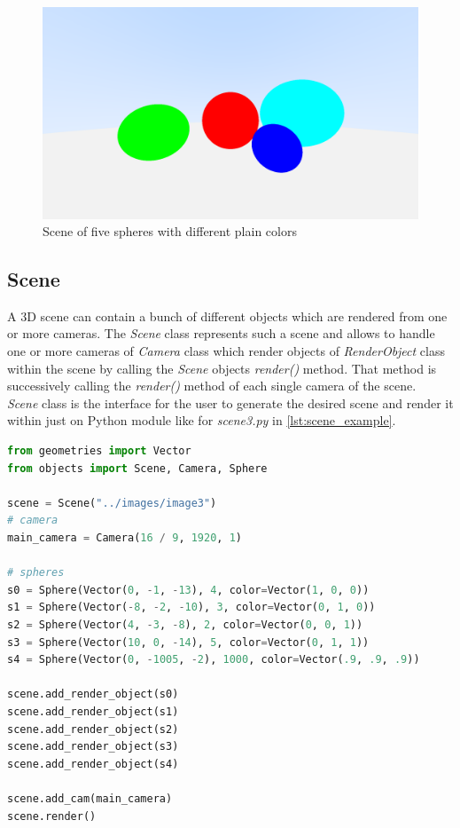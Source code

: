 \documentclass[]{article}
\begin{document}
	\begin{figure}[h]
		\centering
		\includegraphics[width=0.9\linewidth]{image3}
		\caption{Scene of five spheres with different plain colors}
		\label{fig:image3}
	\end{figure}

	\subsection{Scene}
	\label{sec:scene}
	A 3D scene can contain a bunch of different objects which are rendered from one or more cameras. The \emph{Scene} class represents such a scene and allows to handle one or more cameras of \emph{Camera} class which render objects of \emph{RenderObject} class within the scene by calling the \emph{Scene} objects \emph{render()} method. That method is successively calling the \emph{render()} method of each single camera of the scene. 
	\\
	\emph{Scene} class is the interface for the user to generate the desired scene and render it within just on Python module like for \emph{scene3.py} in \cref{lst:scene_example}.
	\begin{lstlisting}[caption={Example for Scene class usage from scene3.py}, language=Python, label=lst:scene_example]
from geometries import Vector
from objects import Scene, Camera, Sphere

scene = Scene("../images/image3")
# camera
main_camera = Camera(16 / 9, 1920, 1)

# spheres
s0 = Sphere(Vector(0, -1, -13), 4, color=Vector(1, 0, 0))
s1 = Sphere(Vector(-8, -2, -10), 3, color=Vector(0, 1, 0))
s2 = Sphere(Vector(4, -3, -8), 2, color=Vector(0, 0, 1))
s3 = Sphere(Vector(10, 0, -14), 5, color=Vector(0, 1, 1))
s4 = Sphere(Vector(0, -1005, -2), 1000, color=Vector(.9, .9, .9))

scene.add_render_object(s0)
scene.add_render_object(s1)
scene.add_render_object(s2)
scene.add_render_object(s3)
scene.add_render_object(s4)

scene.add_cam(main_camera)
scene.render()
	\end{lstlisting}
	
\end{document}
